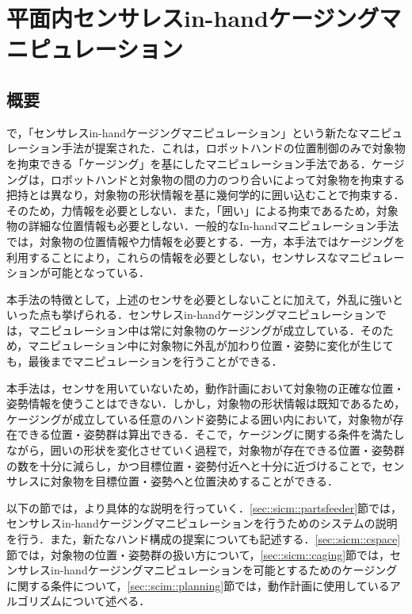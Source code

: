 \documentclass[a4paper,twoside,12pt,papersize, dvipdfmx]{iirthesis}
\begin{document}
    \newcommand{\figref}[1]{\figurename\ref{#1}}
    \newcommand{\tabref}[1]{\tablename\ref{#1}}
    \renewcommand{\eqref}[1]{式~(\ref{#1})}
    \newcommand{\chapref}[1]{\ref{#1}章}
    \newcommand{\secref}[1]{\ref{#1}節}
    \newcommand{\ssecref}[1]{\ref{#1}項}
    \newcommand{\appref}[1]{付録\ref{#1}}
\fi


\chapter{平面内センサレスin-handケージングマニピュレーション}\label{chap::sicm}
\minitoc

\section{概要}
\cite{asamura2013}で，「センサレスin-handケージングマニピュレーション」という新たなマニピュレーション手法が提案された．これは，ロボットハンドの位置制御のみで対象物を拘束できる「ケージング」\cite{rimon1999}を基にしたマニピュレーション手法である．ケージングは，ロボットハンドと対象物の間の力のつり合いによって対象物を拘束する把持とは異なり，対象物の形状情報を基に幾何学的に囲い込むことで拘束する．そのため，力情報を必要としない．また，「囲い」による拘束であるため，対象物の詳細な位置情報も必要としない．一般的なIn-handマニピュレーション手法では，対象物の位置情報や力情報を必要とする．一方，本手法ではケージングを利用することにより，これらの情報を必要としない，センサレスなマニピュレーションが可能となっている．\par
本手法の特徴として，上述のセンサを必要としないことに加えて，外乱に強いといった点も挙げられる．センサレスin-handケージングマニピュレーションでは，マニピュレーション中は常に対象物のケージングが成立している．そのため，マニピュレーション中に対象物に外乱が加わり位置・姿勢に変化が生じても，最後までマニピュレーションを行うことができる．\par
本手法は，センサを用いていないため，動作計画において対象物の正確な位置・姿勢情報を使うことはできない．しかし，対象物の形状情報は既知であるため，ケージングが成立している任意のハンド姿勢による囲い内において，対象物が存在できる位置・姿勢群は算出できる．そこで，ケージングに関する条件を満たしながら，囲いの形状を変化させていく過程で，対象物が存在できる位置・姿勢群の数を十分に減らし，かつ目標位置・姿勢付近へと十分に近づけることで，センサレスに対象物を目標位置・姿勢へと位置決めすることができる．\par
以下の節では，より具体的な説明を行っていく．\secref{sec::sicm::partsfeeder}では，センサレスin-handケージングマニピュレーションを行うためのシステムの説明を行う．また，新たなハンド構成の提案についても記述する．\secref{sec::sicm::cspace}では，対象物の位置・姿勢群の扱い方について，\secref{sec::sicm::caging}では，センサレスin-handケージングマニピュレーションを可能とするためのケージングに関する条件について，\secref{sec::scim::planning}では，動作計画に使用しているアルゴリズムについて述べる．
\end{document}
